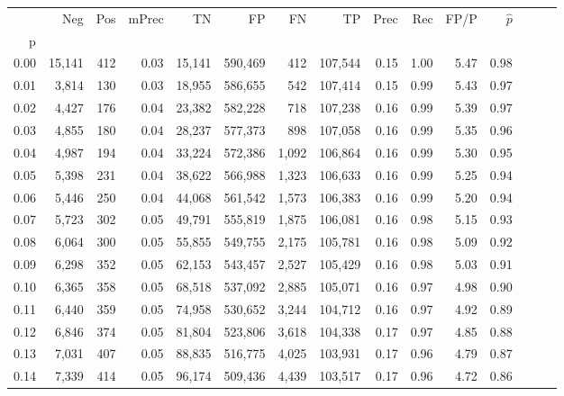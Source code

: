 \begin{tabular}{rrrrrrrrrrrrrrr}
\toprule
{} &     Neg &    Pos & mPrec &       TN &       FP &       FN &       TP &  Prec &   Rec &  FP/P & $\hat{p}$ \\
p    &         &        &       &          &          &          &          &       &       &       &           \\
\midrule
0.00 &  15,141 &    412 &  0.03 &   15,141 &  590,469 &      412 &  107,544 &  0.15 &  1.00 &  5.47 &      0.98 \\
0.01 &   3,814 &    130 &  0.03 &   18,955 &  586,655 &      542 &  107,414 &  0.15 &  0.99 &  5.43 &      0.97 \\
0.02 &   4,427 &    176 &  0.04 &   23,382 &  582,228 &      718 &  107,238 &  0.16 &  0.99 &  5.39 &      0.97 \\
0.03 &   4,855 &    180 &  0.04 &   28,237 &  577,373 &      898 &  107,058 &  0.16 &  0.99 &  5.35 &      0.96 \\
0.04 &   4,987 &    194 &  0.04 &   33,224 &  572,386 &    1,092 &  106,864 &  0.16 &  0.99 &  5.30 &      0.95 \\
0.05 &   5,398 &    231 &  0.04 &   38,622 &  566,988 &    1,323 &  106,633 &  0.16 &  0.99 &  5.25 &      0.94 \\
0.06 &   5,446 &    250 &  0.04 &   44,068 &  561,542 &    1,573 &  106,383 &  0.16 &  0.99 &  5.20 &      0.94 \\
0.07 &   5,723 &    302 &  0.05 &   49,791 &  555,819 &    1,875 &  106,081 &  0.16 &  0.98 &  5.15 &      0.93 \\
0.08 &   6,064 &    300 &  0.05 &   55,855 &  549,755 &    2,175 &  105,781 &  0.16 &  0.98 &  5.09 &      0.92 \\
0.09 &   6,298 &    352 &  0.05 &   62,153 &  543,457 &    2,527 &  105,429 &  0.16 &  0.98 &  5.03 &      0.91 \\
0.10 &   6,365 &    358 &  0.05 &   68,518 &  537,092 &    2,885 &  105,071 &  0.16 &  0.97 &  4.98 &      0.90 \\
0.11 &   6,440 &    359 &  0.05 &   74,958 &  530,652 &    3,244 &  104,712 &  0.16 &  0.97 &  4.92 &      0.89 \\
0.12 &   6,846 &    374 &  0.05 &   81,804 &  523,806 &    3,618 &  104,338 &  0.17 &  0.97 &  4.85 &      0.88 \\
0.13 &   7,031 &    407 &  0.05 &   88,835 &  516,775 &    4,025 &  103,931 &  0.17 &  0.96 &  4.79 &      0.87 \\
0.14 &   7,339 &    414 &  0.05 &   96,174 &  509,436 &    4,439 &  103,517 &  0.17 &  0.96 &  4.72 &      0.86 \\

\end{tabular}
